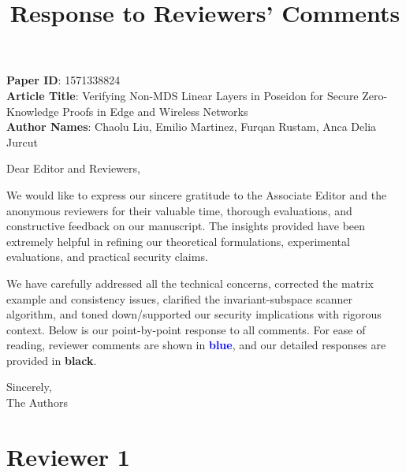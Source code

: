 \documentclass[preprint, 11pt]{article}
\title{\textbf{Response to Reviewers' Comments}}
\author{}
\date{}
\newcounter{reviewerid}
\begin{document}
\maketitle
\thispagestyle{empty}
\pagestyle{empty}

\vspace{1em}

\noindent
\textbf{Paper ID}: 1571338824\\
\textbf{Article Title}: Verifying Non-MDS Linear Layers in Poseidon for Secure Zero-Knowledge Proofs in Edge and Wireless Networks\\
\textbf{Author Names}: Chaolu Liu, Emilio Martinez, Furqan Rustam, Anca Delia Jurcut

\vspace{1em}

\noindent
Dear Editor and Reviewers,

\vspace{0.5em}

\noindent
We would like to express our sincere gratitude to the Associate Editor and the anonymous reviewers for their valuable time, thorough evaluations, and constructive feedback on our manuscript. The insights provided have been extremely helpful in refining our theoretical formulations, experimental evaluations, and practical security claims.

\vspace{0.5em}

\noindent
We have carefully addressed all the technical concerns, corrected the matrix example and consistency issues, clarified the invariant-subspace scanner algorithm, and toned down/supported our security implications with rigorous context. Below is our point-by-point response to all comments. For ease of reading, reviewer comments are shown in \textcolor{blue}{\textbf{blue}}, and our detailed responses are provided in \textbf{black}.

\vspace{1.5em}

\noindent
Sincerely,\\
The Authors

\setcounter{reviewerid}{1}
\section*{Reviewer 1}
\end{document}
